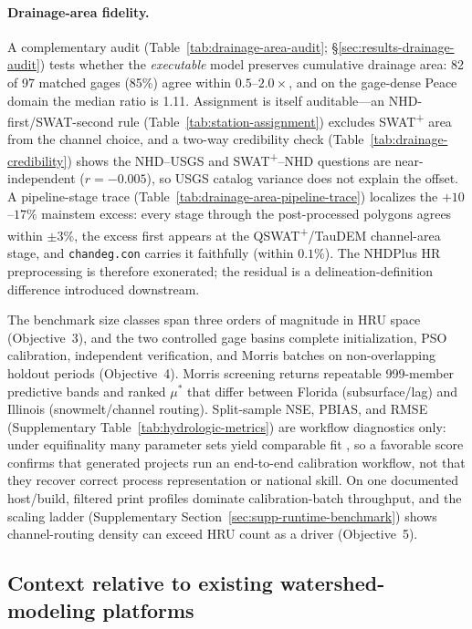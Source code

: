 \paragraph{Drainage-area fidelity.}
A complementary audit (Table~\ref{tab:drainage-area-audit}; \S\ref{sec:results-drainage-audit}) tests whether the \emph{executable} model preserves cumulative drainage area: 82 of 97 matched gages (85\%) agree within $0.5$--$2.0\times$, and on the gage-dense Peace domain the median ratio is 1.11. Assignment is itself auditable---an NHD-first/SWAT-second rule (Table~\ref{tab:station-assignment}) excludes SWAT\textsuperscript{+} area from the channel choice, and a two-way credibility check (Table~\ref{tab:drainage-credibility}) shows the NHD--USGS and SWAT\textsuperscript{+}--NHD questions are near-independent ($r=-0.005$), so USGS catalog variance does not explain the offset. A pipeline-stage trace (Table~\ref{tab:drainage-area-pipeline-trace}) localizes the $+10$--$17\%$ mainstem excess: every stage through the post-processed polygons agrees within $\pm3\%$, the excess first appears at the QSWAT\textsuperscript{+}/TauDEM channel-area stage, and \texttt{chandeg.con} carries it faithfully (within $0.1\%$). The NHDPlus HR preprocessing is therefore exonerated; the residual is a delineation-definition difference introduced downstream.

The benchmark size classes span three orders of magnitude in HRU space (Objective~3), and the two controlled gage basins complete initialization, PSO calibration, independent verification, and Morris batches on non-overlapping holdout periods (Objective~4). Morris screening returns repeatable 999-member predictive bands and ranked $\mu^*$ that differ between Florida (subsurface/lag) and Illinois (snowmelt/channel routing). Split-sample NSE, PBIAS, and RMSE (Supplementary Table~\ref{tab:hydrologic-metrics}) are workflow diagnostics only: under equifinality many parameter sets yield comparable fit \citep{Beven2006EquifinalityManifesto}, so a favorable score confirms that generated projects run an end-to-end calibration workflow, not that they recover correct process representation or national skill. On one documented host/build, filtered print profiles dominate calibration-batch throughput, and the scaling ladder (Supplementary Section~\ref{sec:supp-runtime-benchmark}) shows channel-routing density can exceed HRU count as a driver (Objective~5).

\subsection{Context relative to existing watershed-modeling platforms}

